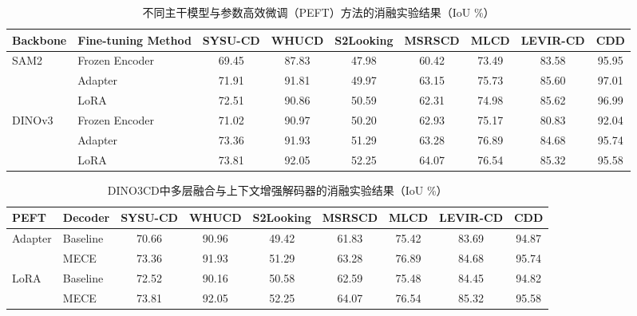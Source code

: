 \begin{table}[!htbp]
\centering
\scriptsize
\setlength{\tabcolsep}{3pt} %
\caption{不同主干模型与参数高效微调（PEFT）方法的消融实验结果（IoU \%）}
\label{tab:peftcd_ablation}
\begin{tabularx}{\textwidth}{p{1.8cm} p{2.5cm} *{7}{c}}
\toprule
\textbf{Backbone} & \textbf{Fine-tuning Method} & \textbf{SYSU-CD} & \textbf{WHUCD} & \textbf{S2Looking} & \textbf{MSRSCD} & \textbf{MLCD} & \textbf{LEVIR-CD} & \textbf{CDD} \\
\midrule
\multirow{3}{*}{SAM2}
& Frozen Encoder & 69.45 & 87.83 & 47.98 & 60.42 & 73.49 & 83.58 & 95.95 \\
& Adapter        & 71.91 & 91.81 & 49.97 & 63.15 & 75.73 & 85.60 & 97.01 \\
& LoRA           & 72.51 & 90.86 & 50.59 & 62.31 & 74.98 & 85.62 & 96.99 \\
\midrule
\multirow{3}{*}{DINOv3}
& Frozen Encoder & 71.02 & 90.97 & 50.20 & 62.93 & 75.17 & 80.83 & 92.04 \\
& Adapter        & 73.36 & 91.93 & 51.29 & 63.28 & 76.89 & 84.68 & 95.74 \\
& LoRA           & 73.81 & 92.05 & 52.25 & 64.07 & 76.54 & 85.32 & 95.58 \\
\bottomrule
\end{tabularx}
\end{table}

\begin{table}[!htbp]
\centering
\scriptsize
\setlength{\tabcolsep}{3pt} %
\caption{DINO3CD中多层融合与上下文增强解码器的消融实验结果（IoU \%）}
\label{tab:peftcd_dino3cd_ablation}
\begin{tabularx}{\textwidth}{p{1.8cm} p{2.5cm} *{7}{c}}
\toprule
\textbf{PEFT} & \textbf{Decoder} & \textbf{SYSU-CD} & \textbf{WHUCD} & \textbf{S2Looking} & \textbf{MSRSCD} & \textbf{MLCD} & \textbf{LEVIR-CD} & \textbf{CDD} \\
\midrule
\multirow{2}{*}{Adapter} 
& Baseline & 70.66 & 90.96 & 49.42 & 61.83 & 75.42 & 83.69 & 94.87 \\
& MECE     & 73.36 & 91.93 & 51.29 & 63.28 & 76.89 & 84.68 & 95.74 \\
\midrule
\multirow{2}{*}{LoRA}    
& Baseline & 72.52 & 90.16 & 50.58 & 62.59 & 75.48 & 84.45 & 94.82 \\
& MECE     & 73.81 & 92.05 & 52.25 & 64.07 & 76.54 & 85.32 & 95.58 \\
\bottomrule
\end{tabularx}
\end{table}


